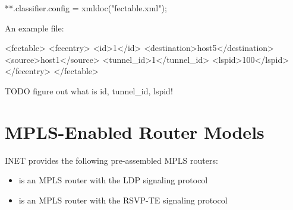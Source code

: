 \begin{inifile}
**.classifier.config = xmldoc("fectable.xml");
\end{inifile}

An example  file:

\begin{XML}
<fectable>
    <fecentry>
        <id>1</id>
        <destination>host5</destination>
        <source>host1</source>
        <tunnel_id>1</tunnel_id>
        <lspid>100</lspid>
    </fecentry>
</fectable>
\end{XML}

TODO figure out what is id, tunnel\_id, lspid!

\section{MPLS-Enabled Router Models}

INET provides the following pre-assembled MPLS routers:

\begin{itemize}
  \item {} is an MPLS router with the LDP signaling protocol
  \item {} is an MPLS router with the RSVP-TE signaling protocol
\end{itemize}



